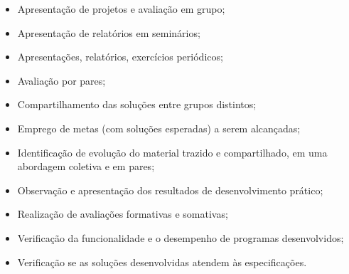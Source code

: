\begin{itemize}
    \item Apresentação de projetos e avaliação em grupo;
    \item Apresentação de relatórios em seminários;
    \item Apresentações, relatórios, exercícios periódicos;
    \item Avaliação por pares;
    \item Compartilhamento das soluções entre grupos distintos;
    \item Emprego de metas (com soluções esperadas) a serem alcançadas;
    \item Identificação de evolução do material trazido e compartilhado, em uma abordagem coletiva e em pares;
    \item Observação e apresentação dos resultados de desenvolvimento prático;
    \item Realização de avaliações formativas e somativas;
    \item Verificação da funcionalidade e o desempenho de programas desenvolvidos;
    \item Verificação se as soluções desenvolvidas atendem às especificações.
\end{itemize}
                                           